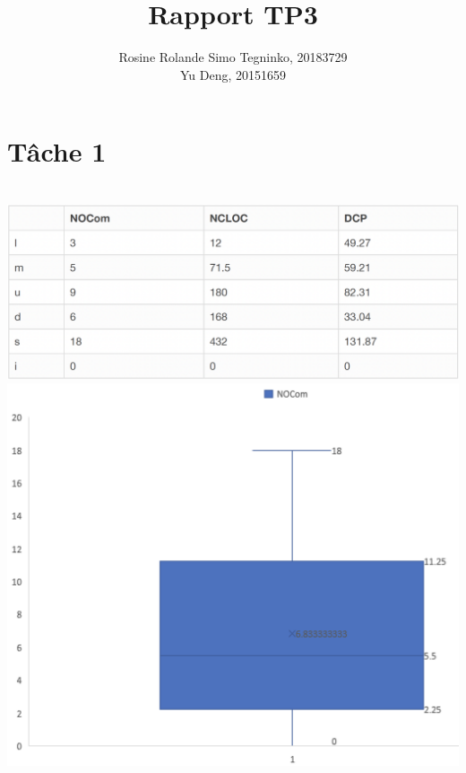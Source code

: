 \documentclass{article}
\title{Rapport TP3}
\author{Rosine Rolande Simo Tegninko, 20183729\\
Yu Deng, 20151659}
\date{}
\begin{document}
\maketitle

\section*{Tâche 1}\\
\includegraphics[scale=0.3]{T1_1.png}\\
\includegraphics[scale=0.5]{NOCom.png}\\
\end{document}
